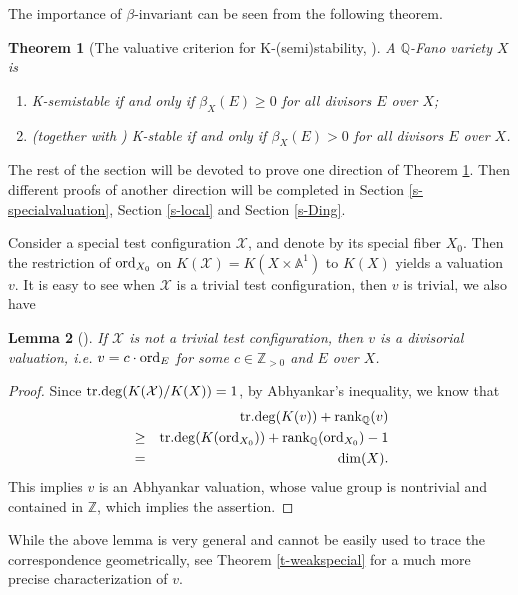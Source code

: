 \documentclass[12pt,reqno]{amsart}%
\newcommand{\cX}{{\mathcal{X}}}
\newcommand{\ord}{{\rm ord}}
\newtheorem{thm}{Theorem}[section]
\newtheorem{lem}[thm]{Lemma}
\theoremstyle{definition}
\theoremstyle{remark}
\begin{document}
\medskip

The  importance of $\beta$-invariant can be seen from the following theorem. 


\begin{thm}[The valuative criterion for K-(semi)stability, {\cite{Fuj19b, Li17}}]\label{t-valkstable}
A $\mathbb{Q}$-Fano variety $X$  is 
\begin{enumerate}
\item  \emph{K-semistable} if and only if $\beta_{X}(E)\ge 0$ for all divisors  $E$ over $X$;
\item (together with \cite{BX19}) \emph{K-stable} if and only if $\beta_{X}(E)> 0$ for all divisors  $E$ over $X$.
 \end{enumerate}
 \end{thm}

The rest of the section will be devoted to prove one direction of Theorem \ref{t-valkstable}. Then different proofs of another direction will be completed in Section \ref{s-specialvaluation}, Section \ref{s-local} and Section \ref{s-Ding}.  

\bigskip
 
 Consider a special test configuration $\cX$, and denote by its special fiber $X_0$. Then the restriction of $\ord_{X_0}$ on $K(\cX)=K(X\times \mathbb{A}^1)$ to $K(X)$ yields a valuation $v$. It is easy to see when $\cX$ is a trivial test configuration, then $v$ is trivial, we also have
\begin{lem}[{\cite[Lemma 4.1]{BHJ17}}]\label{l-induced}
If $\cX$ is not a trivial test configuration, then $v$ is a divisorial valuation, i.e. $v=c\cdot \ord_E$ for some $c\in \mathbb{Z}_{>0}$ and $E$ over $X$. 
\end{lem} 
\begin{proof}Since ${\rm tr. deg}(K(\cX)/K(X))=1$, by Abhyankar's inequality, we know that
\begin{eqnarray*}
& &{\rm tr. deg}(K(v))+ {\rm rank}_{\mathbb{Q}}(v)\\
&\ge &{\rm tr. deg}(K(\ord_{X_0}))+ {\rm rank}_{\mathbb{Q}}(\ord_{X_0})-1\\
&=&\dim (X).
\end{eqnarray*}
This implies $v$ is an Abhyankar valuation, whose value group is nontrivial and contained in $\mathbb{Z}$, which implies the assertion.  
\end{proof}

While the above lemma is very general and cannot be easily used to trace the correspondence geometrically, see Theorem \ref{t-weakspecial} for a much more precise characterization of $v$.
\end{document}

